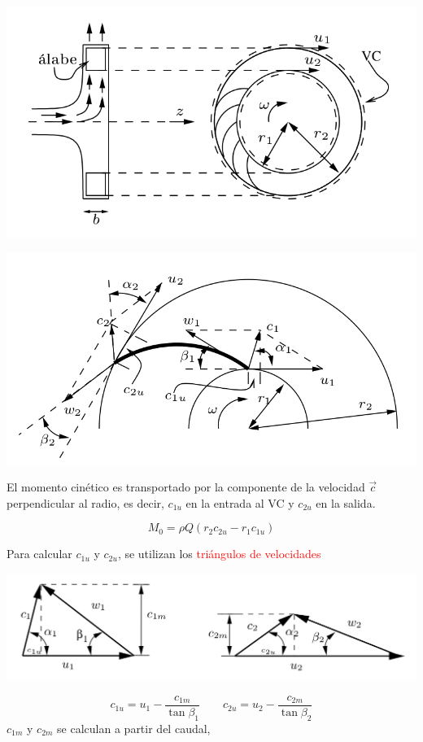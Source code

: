 \begin{center}
	\includegraphics[width=0.5\linewidth]{TeX_files/chapter04-Dinamica/rodete2}
\end{center}


\begin{center}
	\includegraphics[width=0.5\linewidth]{TeX_files/chapter04-Dinamica/alabe1}
\end{center}

El momento cinético es transportado por la componente de la velocidad
$\vec{c}$ perpendicular al radio, es decir, $c_{1u}$ en la entrada
al VC y $c_{2u}$ en la salida. 

\begin{equation}
	M_{0}=\rho Q\left(r_{2}c_{2u}-r_{1}c_{1u}\right)
\end{equation}



Para calcular $c_{1u}$ y $c_{2u}$, se utilizan los \textcolor{red}{triángulos
de velocidades} 

\begin{center}
	\includegraphics[width=0.7\linewidth]{TeX_files/chapter04-Dinamica/triangulo1}
\end{center}



\begin{equation}
	c_{1u}=u_{1}-\frac{c_{1m}}{\tan\beta_{1}}\qquad c_{2u}=u_{2}-\frac{c_{2m}}{\tan\beta_{2}}
\end{equation}
$c_{1m}$ y $c_{2m}$ se calculan a partir del caudal, 

